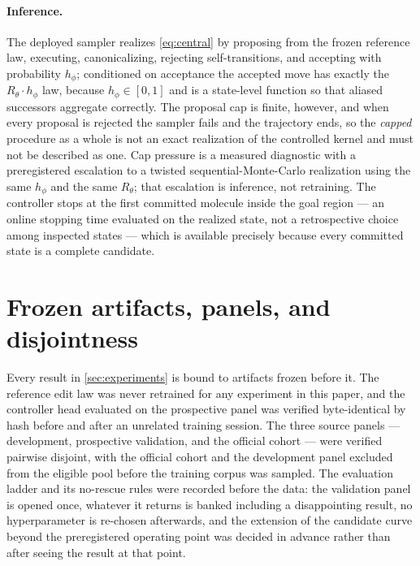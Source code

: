 \paragraph{Inference.}
The deployed sampler realizes \eqref{eq:central} by proposing from the frozen reference law, executing, canonicalizing, rejecting self-transitions, and accepting with probability $h_\phi$; conditioned on acceptance the accepted move has exactly the $R_\theta\cdot h_\phi$ law, because $h_\phi\in[0,1]$ and is a state-level function so that aliased successors aggregate correctly.
The proposal cap is finite, however, and when every proposal is rejected the sampler fails and the trajectory ends, so the \emph{capped} procedure as a whole is not an exact realization of the controlled kernel and must not be described as one.
Cap pressure is a measured diagnostic with a preregistered escalation to a twisted sequential-Monte-Carlo realization using the same $h_\phi$ and the same $R_\theta$; that escalation is inference, not retraining.
The controller stops at the first committed molecule inside the goal region --- an online stopping time evaluated on the realized state, not a retrospective choice among inspected states --- which is available precisely because every committed state is a complete candidate.

\section{Frozen artifacts, panels, and disjointness}
\label{app:audit}

Every result in \cref{sec:experiments} is bound to artifacts frozen before it.
The reference edit law was never retrained for any experiment in this paper, and the controller head evaluated on the prospective panel was verified byte-identical by hash before and after an unrelated training session.
The three source panels --- development, prospective validation, and the official cohort --- were verified pairwise disjoint, with the official cohort and the development panel excluded from the eligible pool before the training corpus was sampled.
The evaluation ladder and its no-rescue rules were recorded before the data: the validation panel is opened once, whatever it returns is banked including a disappointing result, no hyperparameter is re-chosen afterwards, and the extension of the candidate curve beyond the preregistered operating point was decided in advance rather than after seeing the result at that point.

